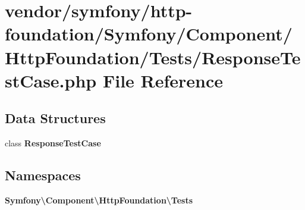 \section{vendor/symfony/http-\/foundation/\+Symfony/\+Component/\+Http\+Foundation/\+Tests/\+Response\+Test\+Case.php File Reference}
\label{_response_test_case_8php}
\subsection*{Data Structures}
\begin{DoxyCompactItemize}
\item 
class {\bf Response\+Test\+Case}
\end{DoxyCompactItemize}
\subsection*{Namespaces}
\begin{DoxyCompactItemize}
\item 
 {\bf Symfony\textbackslash{}\+Component\textbackslash{}\+Http\+Foundation\textbackslash{}\+Tests}
\end{DoxyCompactItemize}
